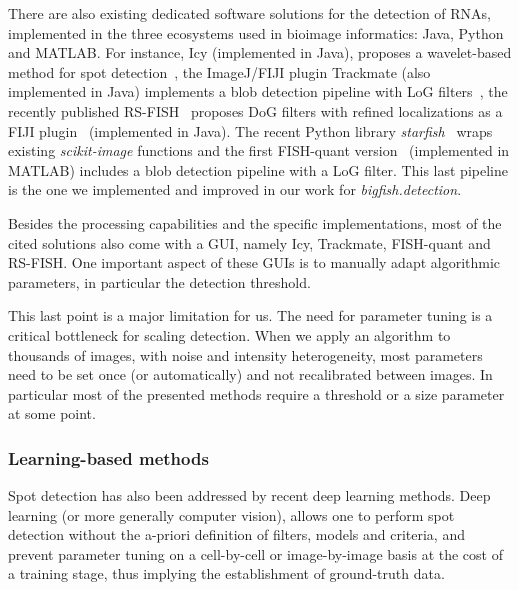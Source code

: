There are also existing dedicated software solutions for the detection of RNAs, implemented in the three ecosystems used in bioimage informatics: Java, Python and MATLAB.
For instance, Icy (implemented in Java), proposes a wavelet-based method for spot detection~\cite{de_chaumont_icy_2012}, the ImageJ/FIJI plugin Trackmate (also implemented in Java) implements a blob detection pipeline with \ac{LoG} filters~\cite{ershov_trackmate_2022}, the recently published RS-FISH~\cite{bahry_rs-fish_2021} proposes \ac{DoG} filters with refined localizations as a FIJI plugin~\cite{schindelin_fiji_2012} (implemented in Java).
The recent Python library \emph{starfish}~\cite{perkel_starfish_2019} wraps existing \emph{scikit-image} functions and the first FISH-quant version~\cite{mueller_fish-quant_2013} (implemented in MATLAB) includes a blob detection pipeline with a \ac{LoG} filter.
This last pipeline is the one we implemented and improved in our work for \emph{bigfish.detection}.

Besides the processing capabilities and the specific implementations, most of the cited solutions also come with a \ac{GUI}, namely Icy, Trackmate, FISH-quant and RS-FISH.
One important aspect of these \ac{GUI}s is to manually adapt algorithmic parameters, in particular the detection threshold.

This last point is a major limitation for us.
The need for parameter tuning is a critical bottleneck for scaling detection.
When we apply an algorithm to thousands of images, with noise and intensity heterogeneity, most parameters need to be set once (or automatically) and not recalibrated between images.
In particular most of the presented methods require a threshold or a size parameter at some point.

\subsubsection{Learning-based methods}

Spot detection has also been addressed by recent deep learning methods.
Deep learning (or more generally computer vision), allows one to perform spot detection without the a-priori definition of filters, models and criteria, and prevent parameter tuning on a cell-by-cell or image-by-image basis at the cost of a training stage, thus implying the establishment of ground-truth data.

